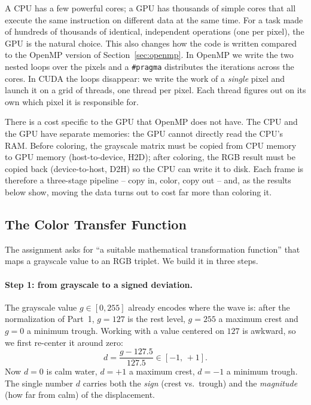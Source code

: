 A CPU has a few powerful cores; a GPU has thousands of simple cores that all
execute the same instruction on different data at the same time. For a task made
of hundreds of thousands of identical, independent operations (one per pixel),
the GPU is the natural choice. This also changes how the code is written compared
to the OpenMP version of Section~\ref{sec:openmp}. In OpenMP we write the two
nested loops over the pixels and a \texttt{\#pragma} distributes the iterations
across the cores. In CUDA the loops disappear: we write the work of a
\emph{single} pixel and launch it on a grid of threads, one thread per pixel.
Each thread figures out on its own which pixel it is responsible for.

There is a cost specific to the GPU that OpenMP does not have. The CPU and the
GPU have separate memories: the GPU cannot directly read the CPU's RAM. Before
coloring, the grayscale matrix must be copied from CPU memory to GPU memory
(host-to-device, H2D); after coloring, the RGB result must be copied back
(device-to-host, D2H) so the CPU can write it to disk. Each frame is therefore a
three-stage pipeline -- copy in, color, copy out -- and, as the results below
show, moving the data turns out to cost far more than coloring it.

\subsection{The Color Transfer Function}
\label{sec:cuda-colorfun}

The assignment asks for ``a suitable mathematical transformation function'' that
maps a grayscale value to an RGB triplet. We build it in three steps.

\paragraph{Step 1: from grayscale to a signed deviation.}
The grayscale value $g\in[0,255]$ already encodes where the wave is: after the
normalization of Part~1, $g=127$ is the rest level, $g=255$ a maximum crest and
$g=0$ a minimum trough. Working with a value centered on $127$ is awkward, so we
first re-center it around zero:
\begin{equation}
    d = \frac{g - 127.5}{127.5} \in [-1,\,+1].
    \label{eq:cuda-d}
\end{equation}
Now $d=0$ is calm water, $d=+1$ a maximum crest, $d=-1$ a minimum trough. The
single number $d$ carries both the \emph{sign} (crest vs.\ trough) and the
\emph{magnitude} (how far from calm) of the displacement.


